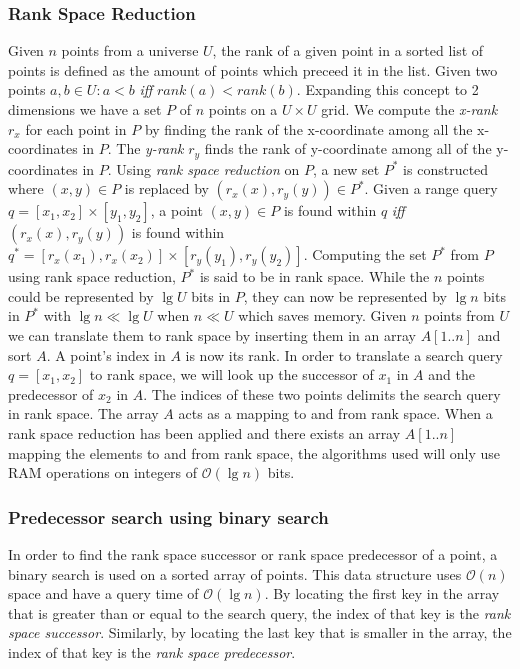 \subsubsection{Rank Space Reduction}
Given $n$ points from a universe $U$, the rank of a given point in a sorted list of points is defined as the amount of points which preceed it in the list. Given two points $a,b \in U: a < b$ \emph{iff} $rank(a) < rank(b)$. Expanding this concept to 2 dimensions we have a set $P$ of $n$ points on a $U \times U$ grid. We compute the \emph{x-rank} $r_x$ for each point in $P$ by finding the rank of the x-coordinate among all the x-coordinates in $P$. The \emph{y-rank} $r_y$ finds the rank of y-coordinate among all of the y-coordinates in $P$. Using \emph{rank space reduction} on $P$, a new set $P^*$ is constructed where $(x,y) \in P$ is replaced by $(r_x(x), r_y(y)) \in P^*$. Given a range query $q = [x_1, x_2] \times [y_1, y_2]$, a point $(x,y) \in P$ is found within $q$ \emph{iff} $(r_x(x), r_y(y))$ is found within $q^* = [r_x(x_1), r_x(x_2)] \times [r_y(y_1), r_y(y_2)]$. Computing the set $P^*$ from $P$ using rank space reduction, $P^*$ is said to be in rank space. While the $n$ points could be represented by $\lg U$ bits in $P$, they can now be represented by $\lg n$ bits in $P^*$ with $\lg n \ll \lg U$ when $n \ll U$ which saves memory. Given $n$ points from $U$ we can translate them to rank space by inserting them in an array $A[1..n]$ and sort $A$. A point's index in $A$ is now its rank. In order to translate a search query $q = [x_1, x_2]$ to rank space, we will look up the successor of $x_1$ in $A$ and the predecessor of $x_2$ in $A$. The indices of these two points delimits the search query in rank space. The array $A$ acts as a mapping to and from rank space.  When a rank space reduction has been applied and there exists an array $A[1..n]$ mapping the elements to and from rank space, the algorithms used will only use RAM operations on integers of $\mathcal{O}(\lg n)$ bits.

\subsubsection{Predecessor search using binary search}
In order to find the rank space successor or rank space predecessor of a point, a binary search is used on a sorted array of points. This data structure uses $\mathcal{O}(n)$ space and have a query time of $\mathcal{O}(\lg n)$. By locating the first key in the array that is greater than or equal to the search query, the index of that key is the \emph{rank space successor}. Similarly, by locating the last key that is smaller in the array, the index of that key is the \emph{rank space predecessor}.



